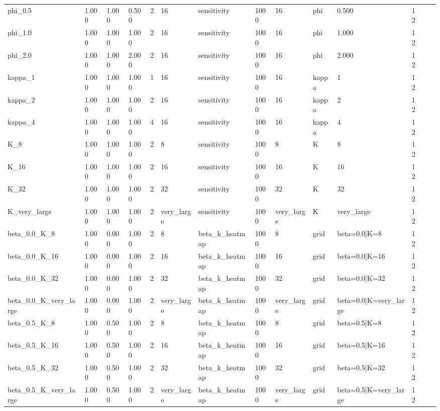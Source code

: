 \begin{tabular}{llllllllllllll}
phi\_0.5 & 1.000 & 1.000 & 0.500 & 2 & 16 & sensitivity & 1000 & 16 & phi & 0.500 & 12 &  &  \\
phi\_1.0 & 1.000 & 1.000 & 1.000 & 2 & 16 & sensitivity & 1000 & 16 & phi & 1.000 & 12 &  &  \\
phi\_2.0 & 1.000 & 1.000 & 2.000 & 2 & 16 & sensitivity & 1000 & 16 & phi & 2.000 & 12 &  &  \\
kappa\_1 & 1.000 & 1.000 & 1.000 & 1 & 16 & sensitivity & 1000 & 16 & kappa & 1 & 12 &  &  \\
kappa\_2 & 1.000 & 1.000 & 1.000 & 2 & 16 & sensitivity & 1000 & 16 & kappa & 2 & 12 &  &  \\
kappa\_4 & 1.000 & 1.000 & 1.000 & 4 & 16 & sensitivity & 1000 & 16 & kappa & 4 & 12 &  &  \\
K\_8 & 1.000 & 1.000 & 1.000 & 2 & 8 & sensitivity & 1000 & 8 & K & 8 & 12 &  &  \\
K\_16 & 1.000 & 1.000 & 1.000 & 2 & 16 & sensitivity & 1000 & 16 & K & 16 & 12 &  &  \\
K\_32 & 1.000 & 1.000 & 1.000 & 2 & 32 & sensitivity & 1000 & 32 & K & 32 & 12 &  &  \\
K\_very\_large & 1.000 & 1.000 & 1.000 & 2 & very\_large & sensitivity & 1000 & very\_large & K & very\_large & 12 &  &  \\
beta\_0.0\_K\_8 & 1.000 & 0.000 & 1.000 & 2 & 8 & beta\_k\_heatmap & 1000 & 8 & grid & beta=0.0|K=8 & 12 &  &  \\
beta\_0.0\_K\_16 & 1.000 & 0.000 & 1.000 & 2 & 16 & beta\_k\_heatmap & 1000 & 16 & grid & beta=0.0|K=16 & 12 &  &  \\
beta\_0.0\_K\_32 & 1.000 & 0.000 & 1.000 & 2 & 32 & beta\_k\_heatmap & 1000 & 32 & grid & beta=0.0|K=32 & 12 &  &  \\
beta\_0.0\_K\_very\_large & 1.000 & 0.000 & 1.000 & 2 & very\_large & beta\_k\_heatmap & 1000 & very\_large & grid & beta=0.0|K=very\_large & 12 &  &  \\
beta\_0.5\_K\_8 & 1.000 & 0.500 & 1.000 & 2 & 8 & beta\_k\_heatmap & 1000 & 8 & grid & beta=0.5|K=8 & 12 &  &  \\
beta\_0.5\_K\_16 & 1.000 & 0.500 & 1.000 & 2 & 16 & beta\_k\_heatmap & 1000 & 16 & grid & beta=0.5|K=16 & 12 &  &  \\
beta\_0.5\_K\_32 & 1.000 & 0.500 & 1.000 & 2 & 32 & beta\_k\_heatmap & 1000 & 32 & grid & beta=0.5|K=32 & 12 &  &  \\
beta\_0.5\_K\_very\_large & 1.000 & 0.500 & 1.000 & 2 & very\_large & beta\_k\_heatmap & 1000 & very\_large & grid & beta=0.5|K=very\_large & 12 &  &  \\

\end{tabular}
